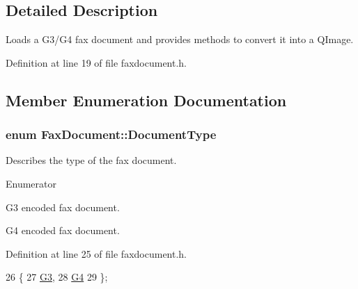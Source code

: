 \subsection{Detailed Description}
Loads a G3/\+G4 fax document and provides methods to convert it into a Q\+Image. 

Definition at line 19 of file faxdocument.\+h.



\subsection{Member Enumeration Documentation}
\hypertarget{classFaxDocument_a0590424a710415338643b6b9c91b30de}{
\subsubsection[{Document\+Type}]{\setlength{\rightskip}{0pt plus 5cm}enum {\bf Fax\+Document\+::\+Document\+Type}}}\label{classFaxDocument_a0590424a710415338643b6b9c91b30de}
Describes the type of the fax document. \begin{Desc}
\item[Enumerator]\par
\begin{description}
\item[{\em 
\hypertarget{classFaxDocument_a0590424a710415338643b6b9c91b30dea2d43ce64c1412ea8a7dfa1fbfe756fd8}{G3}\label{classFaxDocument_a0590424a710415338643b6b9c91b30dea2d43ce64c1412ea8a7dfa1fbfe756fd8}
}]G3 encoded fax document. \item[{\em 
\hypertarget{classFaxDocument_a0590424a710415338643b6b9c91b30dea8a858710690eefc015a052c756899600}{G4}\label{classFaxDocument_a0590424a710415338643b6b9c91b30dea8a858710690eefc015a052c756899600}
}]G4 encoded fax document. \end{description}
\end{Desc}


Definition at line 25 of file faxdocument.\+h.


\begin{DoxyCode}
26     \{
27       \hyperlink{classFaxDocument_a0590424a710415338643b6b9c91b30dea2d43ce64c1412ea8a7dfa1fbfe756fd8}{G3},  
28       \hyperlink{classFaxDocument_a0590424a710415338643b6b9c91b30dea8a858710690eefc015a052c756899600}{G4}   
29     \};
\end{DoxyCode}


